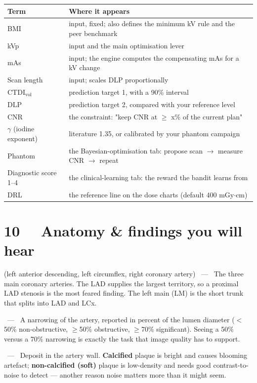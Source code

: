 \documentclass[9pt,a4paper]{extarticle}
\newcommand{\ctdi}{\ensuremath{\mathrm{CTDI}_{\mathrm{vol}}}}
\newcommand{\mgycm}{mGy$\cdot$cm}
\newcommand{\T}[2]{\par\smallskip\noindent{\color{ctbluedark}\bfseries #1} \ --- \ #2\par}
\newcommand{\Tg}[3]{\par\smallskip\noindent{\color{ctbluedark}\bfseries #1} {\scriptsize\color{ctink2}(#2)} \ --- \ #3\par}
\newcommand{\hdr}{\rowcolor{ctsurf}}
\begin{document}
\begin{multicols}{2}
\begin{tabularx}{\columnwidth}{@{}l L@{}}
\toprule
\hdr \textbf{Term} & \textbf{Where it appears}\\
\midrule
BMI & input, fixed; also defines the minimum kV rule and the peer benchmark\\
kVp & input and the main optimisation lever\\
mAs & input; the engine computes the compensating mAs for a kV change\\
Scan length & input; scales DLP proportionally\\
\ctdi{} & prediction target 1, with a 90\% interval\\
DLP & prediction target 2, compared with your reference level\\
CNR & the constraint: "keep CNR at $\ge$ x\% of the current plan"\\
$\gamma$ (iodine exponent) & literature 1.35, or calibrated by your phantom campaign\\
Phantom & the Bayesian-optimisation tab: propose scan $\rightarrow$ measure CNR $\rightarrow$ repeat\\
Diagnostic score 1--4 & the clinical-learning tab: the reward the bandit learns from\\
DRL & the reference line on the dose charts (default 400 \mgycm)\\
\bottomrule
\end{tabularx}

\section{10 \ \ Anatomy \& findings you will hear}

\Tg{LAD / LCx / RCA}{left anterior descending, left circumflex, right coronary artery}{The three main coronary
arteries. The LAD supplies the largest territory, so a proximal LAD stenosis is the most feared finding. The left
main (LM) is the short trunk that splits into LAD and LCx.}

\T{Stenosis}{A narrowing of the artery, reported in percent of the lumen diameter ($<$50\% non-obstructive,
$\ge$50\% obstructive, $\ge$70\% significant). Seeing a 50\% versus a 70\% narrowing is exactly the task that image
quality has to support.}

\T{Plaque}{Deposit in the artery wall. \textbf{Calcified} plaque is bright and causes blooming artefact;
\textbf{non-calcified (soft)} plaque is low-density and needs good contrast-to-noise to detect --- another reason
noise matters more than it might seem.}


\end{multicols}
\end{document}
